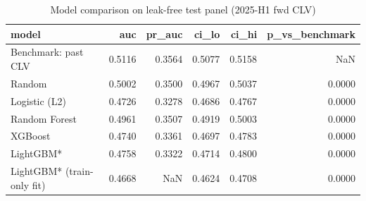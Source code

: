 \begin{table}
\caption{Model comparison on leak-free test panel (2025-H1 fwd CLV)}
\label{tab:t1_main_test}
\begin{tabular}{lrrrrr}
\toprule
model & auc & pr_auc & ci_lo & ci_hi & p_vs_benchmark \\
\midrule
Benchmark: past CLV & 0.5116 & 0.3564 & 0.5077 & 0.5158 & NaN \\
Random & 0.5002 & 0.3500 & 0.4967 & 0.5037 & 0.0000 \\
Logistic (L2) & 0.4726 & 0.3278 & 0.4686 & 0.4767 & 0.0000 \\
Random Forest & 0.4961 & 0.3507 & 0.4919 & 0.5003 & 0.0000 \\
XGBoost & 0.4740 & 0.3361 & 0.4697 & 0.4783 & 0.0000 \\
LightGBM* & 0.4758 & 0.3322 & 0.4714 & 0.4800 & 0.0000 \\
LightGBM* (train-only fit) & 0.4668 & NaN & 0.4624 & 0.4708 & 0.0000 \\
\bottomrule
\end{tabular}
\end{table}
